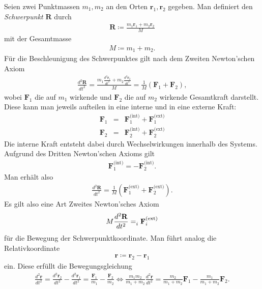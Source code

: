 \documentclass{book}
\let\sum\relax
\DeclareMathOperator*{\sum}{\raisebox{-3.5pt}{\scalebox{2}{\rotatebox{1}{{\bask Σ}}}}}
\begin{document}
%
Seien zwei Punktmassen $m_1, m_2$ an den Orten $\mathbf{r}_1, \mathbf{r}_2$ gegeben. Man definiert den \textit{Schwerpunkt} $\mathbf{R}$ durch
%
\begin{eqnarray}
\mathbf{R} \coloneqq \frac{m_1\mathbf{r}_1 + m_2\mathbf{r}_2}{M}
\end{eqnarray}
%
mit der Gesamtmasse
%
\begin{eqnarray}
M \coloneqq m_1 + m_2.
\end{eqnarray}
%
Für die Beschleunigung des Schwerpunktes gilt nach dem Zweiten Newton'schen Axiom
%
\begin{eqnarray}
\frac{d^2\mathbf{R}}{dt^2} = \frac{m_1\frac{d^2\mathbf{r}_1}{dt^2} + m_2\frac{d^2\mathbf{r}_2}{dt^2}}{M} = \frac{1}{M}\left(\mathbf{F}_1 + \mathbf{F}_2\right), 
\end{eqnarray}
%
wobei $\mathbf{F}_1$ die auf $m_1$ wirkende und $\mathbf{F}_2$ die auf $m_2$ wirkende Gesamtkraft darstellt. Diese kann man jeweils aufteilen in eine interne und in eine externe Kraft:
%
\begin{eqnarray}
\mathbf{F}_1 & = & \mathbf{F}_1^{\text{(int)}} + \mathbf{F}_1^{\text{(ext)}}\\
\mathbf{F}_2 & = & \mathbf{F}_2^{\text{(int)}} + \mathbf{F}_2^{\text{(ext)}}
\end{eqnarray}
%
Die interne Kraft entsteht dabei durch Wechselwirkungen innerhalb des Systems. Aufgrund des Dritten Newton'schen Axioms gilt
%
\begin{eqnarray}
\mathbf{F}_1^{\text{(int)}} = -\mathbf{F}_2^{\text{(int)}}.
\end{eqnarray}
%
Man erhält also
%
\begin{eqnarray}
\frac{d^2\mathbf{R}}{dt^2} = \frac{1}{M}\left(\mathbf{F}_1^{\text{(ext)}} + \mathbf{F}_2^{\text{(ext)}}\right).
\end{eqnarray}
%
Es gilt also eine Art Zweites Newton'sches Axiom
%
\begin{eqnarray}
M\frac{d^2\mathbf{R}}{dt^2} = \sum_{i}^{}\mathbf{F}_i^{\text{(ext)}}
\end{eqnarray}
%
für die Bewegung der Schwerpunktkoordinate. Man führt analog die Relativkoordinate
%
\begin{eqnarray}
\mathbf{r} \coloneqq \mathbf{r}_2 - \mathbf{r}_1
\end{eqnarray}
%
ein. Diese erfüllt die Bewegungsgleichung
%
\begin{eqnarray}
\frac{d^2\mathbf{r}}{dt^2} = \frac{d^2\mathbf{r}_2}{dt^2} - \frac{d^2\mathbf{r}_1}{dt^2} = \frac{\mathbf{F}_1}{m_1} - \frac{\mathbf{F}_2}{m_2}\Leftrightarrow \frac{m_1m_2}{m_1 + m_2}\frac{d^2\mathbf{r}}{dt^2} = \frac{m_2}{m_1 + m_2}\mathbf{F}_1 - \frac{m_1}{m_1 + m_2}\mathbf{F}_2.
\end{eqnarray}
\end{document}
